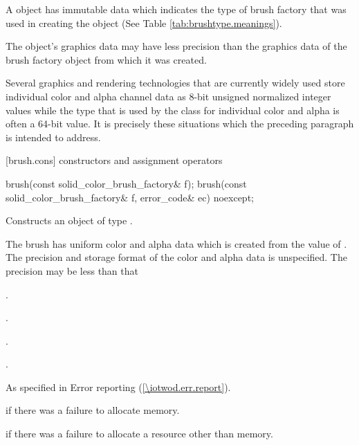 \pnum
A  object has immutable  data which indicates the type of brush factory that was used in creating the  object (See Table \ref{tab:brushtype.meanings}).

\pnum
The  object's graphics data may have less precision than the graphics data of the brush factory object from which it was created.

\pnum
\enterexample
Several graphics and rendering technologies that are currently widely used store individual color and alpha channel data as 8-bit unsigned normalized integer values while the  type that is used by the  class for individual color and alpha is often a 64-bit value. It is precisely these situations which the preceding paragraph is intended to address.
\exitexample

 [brush.cons] { constructors and assignment operators}

\begin{itemdecl}
    brush(const solid_color_brush_factory& f);
    brush(const solid_color_brush_factory& f, error_code& ec) noexcept;
\end{itemdecl}
\begin{itemdescr}
	\pnum
	\effects
	Constructs an object of type .
	
	\pnum
	The brush has uniform color and alpha data which is created from the value of . The precision and storage format of the color and alpha data is unspecified. The precision may be less than that  
	
	\pnum
	\postconditions
	.
	
	.
	
	.
	
	.

	\pnum
	\throws
	As specified in Error reporting (\ref{\iotwod.err.report}).
	
	\pnum
	\errors
	 if there was a failure to allocate memory.
	
	 if there was a failure to allocate a resource other than memory.
	
\end{itemdescr}

